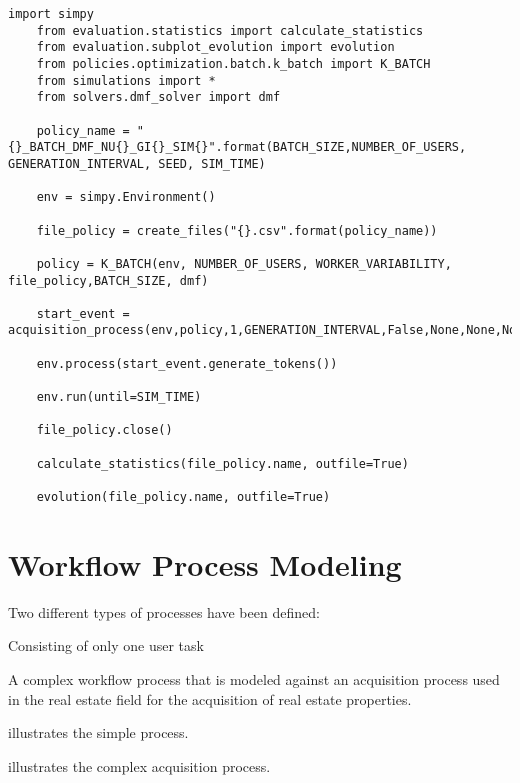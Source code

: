 \begin{lstlisting}[caption=Example of the structure of a simulation script. Here for the K-Batch policy using the \gls{dmf} formulation,label=lst:simulation_script,style=CustomPython]
	import simpy
	from evaluation.statistics import calculate_statistics
	from evaluation.subplot_evolution import evolution
	from policies.optimization.batch.k_batch import K_BATCH
	from simulations import *
	from solvers.dmf_solver import dmf

	policy_name = "{}_BATCH_DMF_NU{}_GI{}_SIM{}".format(BATCH_SIZE,NUMBER_OF_USERS, GENERATION_INTERVAL, SEED, SIM_TIME)

	env = simpy.Environment()

	file_policy = create_files("{}.csv".format(policy_name))

	policy = K_BATCH(env, NUMBER_OF_USERS, WORKER_VARIABILITY, file_policy,BATCH_SIZE, dmf)

	start_event = acquisition_process(env,policy,1,GENERATION_INTERVAL,False,None,None,None)

	env.process(start_event.generate_tokens())

	env.run(until=SIM_TIME)

	file_policy.close()

	calculate_statistics(file_policy.name, outfile=True)

	evolution(file_policy.name, outfile=True)
\end{lstlisting}

\section{Workflow Process Modeling}

Two different types of processes have been defined:
\begin{enumerate*}
	\item Consisting of only one user task
	\item A complex workflow process that is modeled against an acquisition process used in the real estate field for the acquisition of real estate properties.
\end{enumerate*}

 illustrates the simple process.


 illustrates the complex acquisition process.


